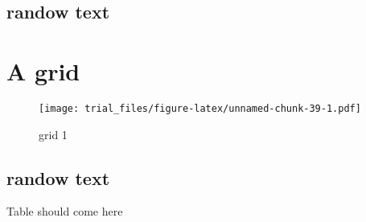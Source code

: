 \documentclass[]{article}
\begin{document}
\subsection{randow text}\label{randow-text-21}

\lipsum

\section{A grid}\label{a-grid-10}

\begin{figure}[htbp]
\centering
\texttt{[image: trial\_files/figure-latex/unnamed-chunk-39-1.pdf]}
\caption{grid 1}
\end{figure}

\subsection{randow text}\label{randow-text-22}

\lipsum

Table should come here
\end{document}
